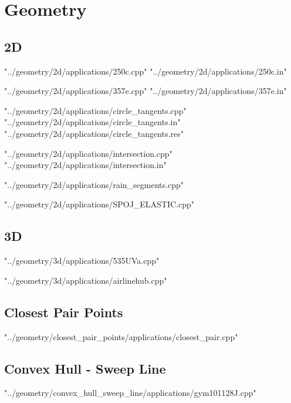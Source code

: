 \documentclass [12pt,onecolumn,oneside]{article}
\begin{document}
\section{Geometry}
\subsection{ 2D}
 {"../geometry/2d/applications/250c.cpp"}
 {"../geometry/2d/applications/250c.in"}
\newpage

 {"../geometry/2d/applications/357e.cpp"}
 {"../geometry/2d/applications/357e.in"}
\newpage

 {"../geometry/2d/applications/circle_tangents.cpp"}
 {"../geometry/2d/applications/circle_tangents.in"}
 {"../geometry/2d/applications/circle_tangents.res"}
\newpage

 {"../geometry/2d/applications/intersection.cpp"}
 {"../geometry/2d/applications/intersection.in"}
\newpage

 {"../geometry/2d/applications/rain_segments.cpp"}
\newpage

 {"../geometry/2d/applications/SPOJ_ELASTIC.cpp"}
\newpage

\subsection{ 3D}
 {"../geometry/3d/applications/535UVa.cpp"}
\newpage

 {"../geometry/3d/applications/airlinehub.cpp"}
\newpage

\subsection{ Closest Pair Points}
 {"../geometry/closest_pair_points/applications/closest_pair.cpp"}
\newpage

\subsection{ Convex Hull - Sweep Line}
 {"../geometry/convex_hull_sweep_line/applications/gym101128J.cpp"}
\newpage
\end{document}

